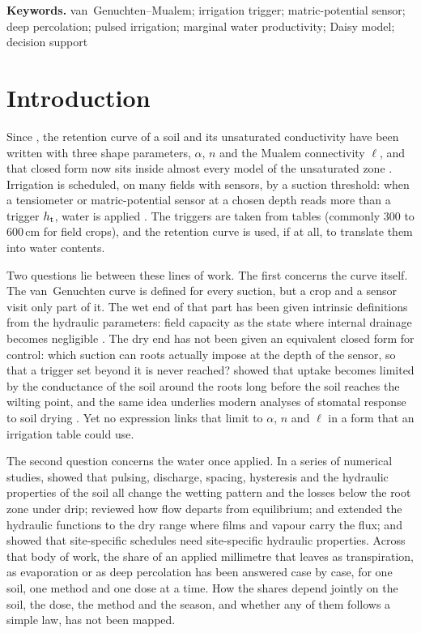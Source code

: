 \begin{titlepage}
{\medskip\noindent \textbf{Keywords.} van~Genuchten--Mualem; irrigation trigger; matric-potential sensor; deep percolation; pulsed irrigation; marginal water productivity; Daisy model; decision support\par}

\end{titlepage}

\section{Introduction}
Since \citet{vanGenuchten1980}, the retention curve of a soil and its unsaturated conductivity have been written with three shape parameters, $\alpha$, $n$ and the Mualem connectivity $\ell$, and that closed form now sits inside almost every model of the unsaturated zone \citep{vanGenuchten1985,Nielsen1986,Schaap2001,Simunek2016}. Irrigation is scheduled, on many fields with sensors, by a suction threshold: when a tensiometer or matric-potential sensor at a chosen depth reads more than a trigger $h_{\mathrm{t}}$, water is applied \citep{Allen1998}. The triggers are taken from tables (commonly 300 to 600\,cm for field crops), and the retention curve is used, if at all, to translate them into water contents.

Two questions lie between these lines of work. The first concerns the curve itself. The van~Genuchten curve is defined for every suction, but a crop and a sensor visit only part of it. The wet end of that part has been given intrinsic definitions from the hydraulic parameters: field capacity as the state where internal drainage becomes negligible \citep{Twarakavi2009,Assouline2014}. The dry end has not been given an equivalent closed form for control: which suction can roots actually impose at the depth of the sensor, so that a trigger set beyond it is never reached? \citet{Gardner1960} showed that uptake becomes limited by the conductance of the soil around the roots long before the soil reaches the wilting point, and the same idea underlies modern analyses of stomatal response to soil drying \citep{Carminati2020}. Yet no expression links that limit to $\alpha$, $n$ and $\ell$ in a form that an irrigation table could use.

The second question concerns the water once applied. In a series of numerical studies, \citet{Elmaloglou2007,Elmaloglou2008,Elmaloglou2009a,Elmaloglou2009b,Elmaloglou2010} showed that pulsing, discharge, spacing, hysteresis and the hydraulic properties of the soil all change the wetting pattern and the losses below the root zone under drip; \citet{Diamantopoulos2012VZJ} reviewed how flow departs from equilibrium; \citet{Weber2019} and \citet{Iden2021} extended the hydraulic functions to the dry range where films and vapour carry the flux; and \citet{Kumar2022} showed that site-specific schedules need site-specific hydraulic properties. Across that body of work, the share of an applied millimetre that leaves as transpiration, as evaporation or as deep percolation has been answered case by case, for one soil, one method and one dose at a time. How the shares depend jointly on the soil, the dose, the method and the season, and whether any of them follows a simple law, has not been mapped.

